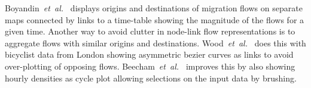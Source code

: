 \documentclass[a4paper,twocolumn]{article}
\newcommand{\etal}{\emph{et~al.~}}
\begin{document}
Boyandin~\etal\cite{Boyandin2011} displays origins and
destinations of migration flows on separate maps connected
by links to a time-table showing the magnitude of the flows
for a given time.
Another way to avoid clutter in node-link
flow representations is to aggregate flows with
similar origins and destinations.
Wood~\etal\cite{Wood2011} does this with bicyclist data
from London showing asymmetric bezier curves as links to avoid
over-plotting of opposing flows.
Beecham~\etal\cite{Beecham2012} improves
this by also showing hourly densities as cycle
plot allowing selections on the input data by brushing.



\end{document}

